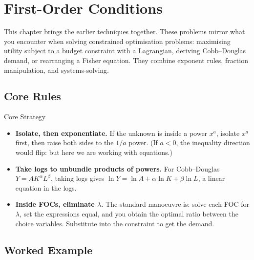 \chapter{First-Order Conditions}

This chapter brings the earlier techniques together. These problems mirror
what you encounter when solving constrained optimisation problems:
maximising utility subject to a budget constraint with a Lagrangian,
deriving Cobb--Douglas demand, or rearranging a Fisher equation. They
combine exponent rules, fraction manipulation, and systems-solving.

\section{Core Rules}

\begin{rulebox}{Core Strategy}
\begin{itemize}[leftmargin=1.6em,itemsep=0.3ex]
  \item \textbf{Isolate, then exponentiate.} If the unknown is inside a
        power $x^a$, isolate $x^a$ first, then raise both sides to the
        $1/a$ power. \;(If $a < 0$, the inequality direction would flip:
        but here we are working with equations.)
  \item \textbf{Take logs to unbundle products of powers.} For
        Cobb--Douglas $Y = A K^\alpha L^\beta$, taking logs gives
        $\ln Y = \ln A + \alpha \ln K + \beta \ln L$, a linear equation
        in the logs.
  \item \textbf{Inside FOCs, eliminate $\lambda$.} The standard
        manoeuvre is: solve each FOC for $\lambda$, set the expressions
        equal, and you obtain the optimal ratio between the choice
        variables. Substitute into the constraint to get the demand.
\end{itemize}
\end{rulebox}

\section{Worked Example}

